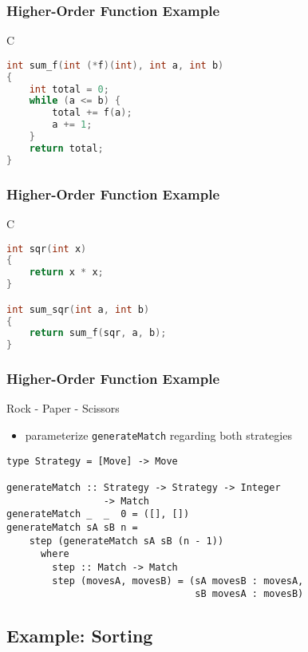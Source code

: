 \documentclass[dvipsnames]{beamer}
\theoremstyle{plain}
\begin{document}
\begin{frame}[fragile]
  \frametitle{Higher-Order Function Example}

  \begin{exampleblock}{C}
    \begin{lstlisting}[language=C]
int sum_f(int (*f)(int), int a, int b)
{
    int total = 0;
    while (a <= b) {
        total += f(a);
        a += 1;
    }
    return total;
}
    \end{lstlisting}
  \end{exampleblock}
\end{frame}

\begin{frame}[fragile]
  \frametitle{Higher-Order Function Example}

  \begin{exampleblock}{C}
    \begin{lstlisting}[language=C]
int sqr(int x)
{
    return x * x;
}

int sum_sqr(int a, int b)
{
    return sum_f(sqr, a, b);
}
    \end{lstlisting}
  \end{exampleblock}
\end{frame}

\begin{frame}[fragile]
  \frametitle{Higher-Order Function Example}

  \begin{exampleblock}{Rock - Paper - Scissors}
    \begin{itemize}
      \item parameterize \lstinline|generateMatch| regarding both strategies
    \end{itemize}

    \begin{lstlisting}
type Strategy = [Move] -> Move

generateMatch :: Strategy -> Strategy -> Integer
                 -> Match
generateMatch _  _  0 = ([], [])
generateMatch sA sB n =
    step (generateMatch sA sB (n - 1))
      where
        step :: Match -> Match
        step (movesA, movesB) = (sA movesB : movesA,
                                 sB movesA : movesB)
    \end{lstlisting}
  \end{exampleblock}
\end{frame}

\subsection{Example: Sorting}
\end{document}

